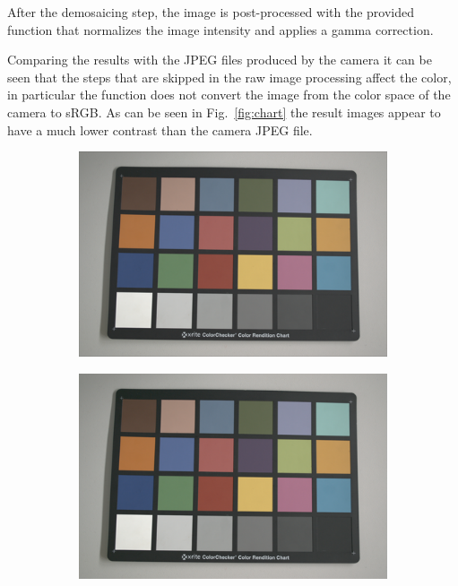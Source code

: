 \documentclass[a4paper,oneside]{article}
\begin{document}
After the demosaicing step, the image is post-processed with the
provided  function that normalizes the image
intensity and applies a gamma correction.

Comparing the results with the JPEG files produced by the camera it
can be seen that the steps that are skipped in the raw image processing
affect the color, in particular the  function
does not convert the image from the color space of the camera to
sRGB. As can be seen in Fig.~\ref{fig:chart} the result images appear
to have a much lower contrast than the camera JPEG file.
\begin{figure}[htbp]
  \centering
  \begin{subfigure}{.33\textwidth}
  \centering
  \includegraphics[width=.95\linewidth]{demosaic_macbeth_color_small}
  \caption{}
\end{subfigure}%
\begin{subfigure}{.33\textwidth}
  \centering
  \includegraphics[width=.95\linewidth]{matlab_demosaic_macbeth_color_small}

\end{subfigure}
\end{figure}
\end{document}
